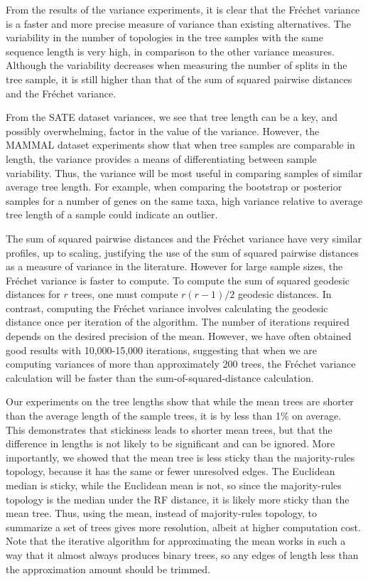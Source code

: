 \documentclass[12pt,letterpaper]{article}
\theoremstyle{plain}
\theoremstyle{definition}
\begin{document}
From the results of the variance experiments, it is clear that the Fr\'echet variance is a faster and more precise measure of variance than existing alternatives. The variability in the number of topologies in the tree samples with the same sequence length is very high, in comparison to the other variance measures. Although the variability decreases when measuring the number of splits in the tree sample, it is still higher than that of the sum of squared pairwise distances and the Fr\'echet variance.  {From the SATE dataset variances, we see that tree length can be a key, and possibly overwhelming, factor in the value of the variance.  However, the MAMMAL dataset experiments show that when tree samples are comparable in length, the variance provides a means of differentiating between sample variability.  Thus, the variance will be most useful in comparing samples of similar average tree length.  For example, when comparing the bootstrap or posterior samples for a number of genes on the same taxa, high variance relative to average tree length of a sample could indicate an outlier. 

The sum of squared pairwise distances and the Fr\'echet variance have very similar profiles, up to scaling, justifying the use of the sum of squared pairwise distances as a measure of variance in the literature.  However for large sample sizes, the Fr\'echet variance is faster to compute.  To compute the sum of squared geodesic distances for $r$ trees, one must compute $r(r-1)/2$ geodesic distances.  In contrast, computing the Fr\'echet variance involves calculating the geodesic distance once per iteration of the algorithm.  The number of iterations required depends on the desired precision of the mean.  However, we have often obtained good results with 10,000-15,000 iterations, suggesting that when we are computing variances of more than approximately 200 trees, the Fr\'echet variance calculation will be faster than the sum-of-squared-distance calculation.
 
Our experiments on the tree lengths show that while the mean trees are shorter than the average length of the sample trees, it is by less than 1\% on average. This demonstrates that stickiness leads to shorter mean trees, but that the difference in lengths is not likely to be significant and can be ignored.  More importantly, we showed that the mean tree is less sticky than the majority-rules topology, because it has the same or fewer unresolved edges.  The Euclidean median is sticky, while the Euclidean mean is not, so since the majority-rules topology is the median under the RF distance, it is likely more sticky than the mean tree.  Thus, using the mean, instead of majority-rules topology, to summarize a set of trees gives more resolution, albeit at higher computation cost.  Note that the iterative algorithm for approximating the mean works in such a way that it almost always produces binary trees, so any edges of length less than the approximation amount should be trimmed.  

}
\end{document}
